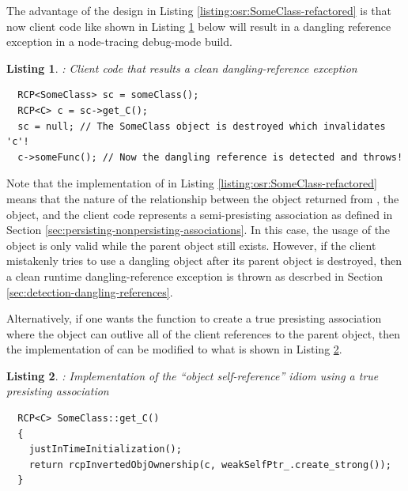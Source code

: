 \documentclass[pdf,ps2pdf,11pt]{SANDreport}
\newtheorem{listing}{Listing}
\begin{document}
The advantage of the design in Listing
{}\ref{listing:osr:SomeClass-refactored} is that now client code like
shown in Listing {}\ref{listing:osr:dangling-ref-SomeClass} below will
result in a dangling reference exception in a node-tracing debug-mode
build.


\begin{listing}: Client code that results a clean dangling-reference exception  \\
\label{listing:osr:dangling-ref-SomeClass}
{\small\begin{verbatim}
  RCP<SomeClass> sc = someClass();
  RCP<C> c = sc->get_C();
  sc = null; // The SomeClass object is destroyed which invalidates 'c'!
  c->someFunc(); // Now the dangling reference is detected and throws!
\end{verbatim}}
\end{listing}


Note that the implementation of {} in Listing
{}\ref{listing:osr:SomeClass-refactored} means that the nature of the
relationship between the {} object returned from
{}, the {} object, and the
client code represents a semi-presisting association as defined in
Section {}\ref{sec:persisting-nonpersisting-associations}.  In this
case, the usage of the {} object is only valid while the parent
{} object still exists.  However, if the client
mistakenly tries to use a dangling {} object after its parent
{} object is destroyed, then a clean runtime
dangling-reference exception is thrown as descrbed in Section
{}\ref{sec:detection-dangling-references}.

Alternatively, if one wants the {} function
to create a true presisting association where the {} object can
outlive all of the client references to the parent {}
object, then the implementation of {} can be
modified to what is shown in Listing
{}\ref{listing:osr:SomeClass-get_C-persisting}.


\begin{listing}:  Implementation of the ``object self-reference'' idiom
using a true presisting association  \\
\label{listing:osr:SomeClass-get_C-persisting}
{\small\begin{verbatim}
  RCP<C> SomeClass::get_C()
  {
    justInTimeInitialization();
    return rcpInvertedObjOwnership(c, weakSelfPtr_.create_strong());
  }
\end{verbatim}}
\end{listing}
\end{document}
